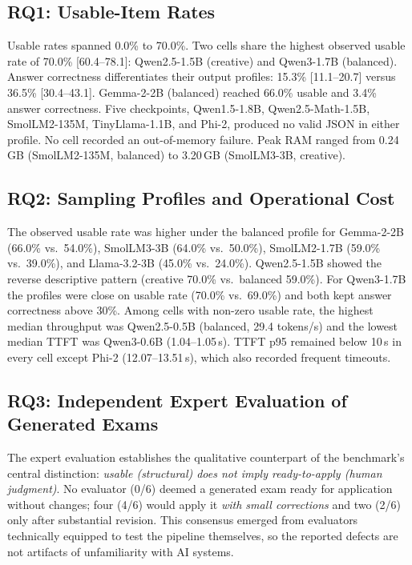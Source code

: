 \documentclass[fleqn,10pt]{JLA_article}
\begin{document}
\subsection{RQ1: Usable-Item Rates}
Usable rates spanned 0.0\% to 70.0\%. Two cells share the highest observed usable rate of 70.0\% [60.4--78.1]: Qwen2.5-1.5B (creative) and Qwen3-1.7B (balanced). Answer correctness differentiates their output profiles: 15.3\% [11.1--20.7] versus 36.5\% [30.4--43.1]. Gemma-2-2B (balanced) reached 66.0\% usable and 3.4\% answer correctness. Five checkpoints, Qwen1.5-1.8B, Qwen2.5-Math-1.5B, SmolLM2-135M, TinyLlama-1.1B, and Phi-2, produced no valid JSON in either profile. No cell recorded an out-of-memory failure. Peak RAM ranged from 0.24\,GB (SmolLM2-135M, balanced) to 3.20\,GB (SmolLM3-3B, creative).

\subsection{RQ2: Sampling Profiles and Operational Cost}
The observed usable rate was higher under the balanced profile for Gemma-2-2B (66.0\% vs.\ 54.0\%), SmolLM3-3B (64.0\% vs.\ 50.0\%), SmolLM2-1.7B (59.0\% vs.\ 39.0\%), and Llama-3.2-3B (45.0\% vs.\ 24.0\%). Qwen2.5-1.5B showed the reverse descriptive pattern (creative 70.0\% vs.\ balanced 59.0\%). For Qwen3-1.7B the profiles were close on usable rate (70.0\% vs.\ 69.0\%) and both kept answer correctness above 30\%. Among cells with non-zero usable rate, the highest median throughput was Qwen2.5-0.5B (balanced, 29.4 tokens/s) and the lowest median TTFT was Qwen3-0.6B (1.04--1.05\,s). TTFT p95 remained below 10\,s in every cell except Phi-2 (12.07--13.51\,s), which also recorded frequent timeouts.

\subsection{RQ3: Independent Expert Evaluation of Generated Exams}
The expert evaluation establishes the qualitative counterpart of the benchmark's central distinction: \emph{usable (structural) does not imply ready-to-apply (human judgment)}. No evaluator (0/6) deemed a generated exam ready for application without changes; four (4/6) would apply it \emph{with small corrections} and two (2/6) only after substantial revision. This consensus emerged from evaluators technically equipped to test the pipeline themselves, so the reported defects are not artifacts of unfamiliarity with AI systems.
\end{document}
